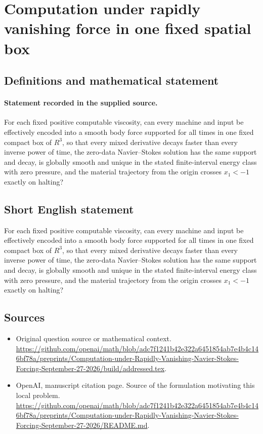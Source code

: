 \documentclass[11pt]{article}
\begin{document}
\section*{Computation under rapidly vanishing force in one fixed spatial box}\label{30007334}
\subsection{Definitions and mathematical statement}
\paragraph{Statement recorded in the supplied source.}
For each fixed positive computable viscosity, can every machine and input be effectively encoded into a smooth body force supported for all times in one fixed compact box of $R^3$, so that every mixed derivative decays faster than every inverse power of time, the zero-data Navier–Stokes solution has the same support and decay, is globally smooth and unique in the stated finite-interval energy class with zero pressure, and the material trajectory from the origin crosses $x_1<-1$ exactly on halting?
\subsection{Short English statement}
For each fixed positive computable viscosity, can every machine and input be effectively encoded into a smooth body force supported for all times in one fixed compact box of $R^3$, so that every mixed derivative decays faster than every inverse power of time, the zero-data Navier–Stokes solution has the same support and decay, is globally smooth and unique in the stated finite-interval energy class with zero pressure, and the material trajectory from the origin crosses $x_1<-1$ exactly on halting?
\subsection{Sources}
\begin{itemize}
\item[S1] Original question source or mathematical context.
\url{https://github.com/openai/math/blob/adc7f1241b42e322a6451854ab7e4b4c146bf78a/preprints/Computation-under-Rapidly-Vanishing-Navier-Stokes-Forcing-September-27-2026/build/addressed.tex}.
\item[S2] OpenAI, manuscript citation page. Source of the formulation motivating this local problem.
\url{https://github.com/openai/math/blob/adc7f1241b42e322a6451854ab7e4b4c146bf78a/preprints/Computation-under-Rapidly-Vanishing-Navier-Stokes-Forcing-September-27-2026/README.md}.
\end{itemize}
\end{document}
